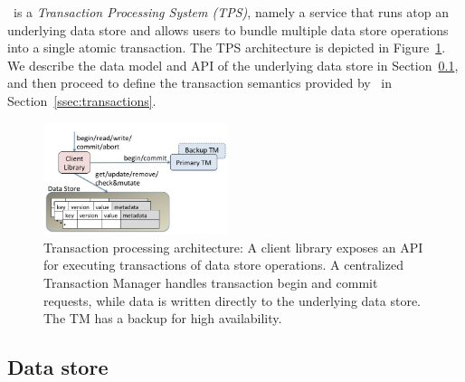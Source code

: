 

\sys\ is a \emph{Transaction Processing System (TPS)}, namely a service that runs atop an underlying data store and 
allows users to bundle multiple data store operations into a single atomic transaction. 
The TPS architecture is depicted in Figure~\ref{fig:components}.
We describe the data model and API of the underlying data store in Section~\ref{ssec:data-model}, and 
then proceed to define  the transaction semantics provided by \sys\ in Section~\ref{ssec:transactions}. 

\begin{figure}
\includegraphics[width=0.48\textwidth]{FragolaComponents.jpg}
\caption{Transaction processing architecture: A client library exposes an  API for  executing transactions of data store operations. 
A centralized Transaction Manager handles transaction begin and commit requests, while data is written directly to the underlying data store.
The TM has a backup for high availability.}
\label{fig:components}
\end{figure}

\subsection{Data store}
\label{ssec:data-model}

